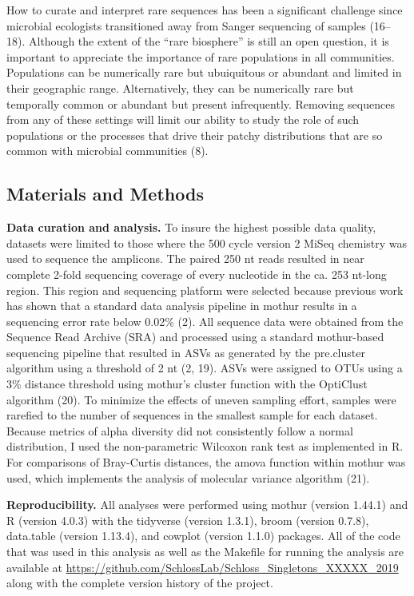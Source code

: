 \documentclass[
]{article}
\begin{document}
How to curate and interpret rare sequences has been a significant
challenge since microbial ecologists transitioned away from Sanger
sequencing of samples (16--18). Although the extent of the ``rare
biosphere'' is still an open question, it is important to appreciate the
importance of rare populations in all communities. Populations can be
numerically rare but ubuiquitous or abundant and limited in their
geographic range. Alternatively, they can be numerically rare but
temporally common or abundant but present infrequently. Removing
sequences from any of these settings will limit our ability to study the
role of such populations or the processes that drive their patchy
distributions that are so common with microbial communities (8).

\hypertarget{materials-and-methods}{%
\subsection{Materials and Methods}\label{materials-and-methods}}

\textbf{Data curation and analysis.} To insure the highest possible data
quality, datasets were limited to those where the 500 cycle version 2
MiSeq chemistry was used to sequence the amplicons. The paired 250 nt
reads resulted in near complete 2-fold sequencing coverage of every
nucleotide in the ca. 253 nt-long region. This region and sequencing
platform were selected because previous work has shown that a standard
data analysis pipeline in mothur results in a sequencing error rate
below 0.02\% (2). All sequence data were obtained from the Sequence Read
Archive (SRA) and processed using a standard mothur-based sequencing
pipeline that resulted in ASVs as generated by the pre.cluster algorithm
using a threshold of 2 nt (2, 19). ASVs were assigned to OTUs using a
3\% distance threshold using mothur's cluster function with the
OptiClust algorithm (20). To minimize the effects of uneven sampling
effort, samples were rarefied to the number of sequences in the smallest
sample for each dataset. Because metrics of alpha diversity did not
consistently follow a normal distribution, I used the non-parametric
Wilcoxon rank test as implemented in R. For comparisons of Bray-Curtis
distances, the amova function within mothur was used, which implements
the analysis of molecular variance algorithm (21).

\textbf{Reproducibility.} All analyses were performed using mothur
(version 1.44.1) and R (version 4.0.3) with the tidyverse (version
1.3.1), broom (version 0.7.8), data.table (version 1.13.4), and cowplot
(version 1.1.0) packages. All of the code that was used in this analysis
as well as the Makefile for running the analysis are available at
\url{https://github.com/SchlossLab/Schloss_Singletons_XXXXX_2019} along
with the complete version history of the project.
\end{document}
